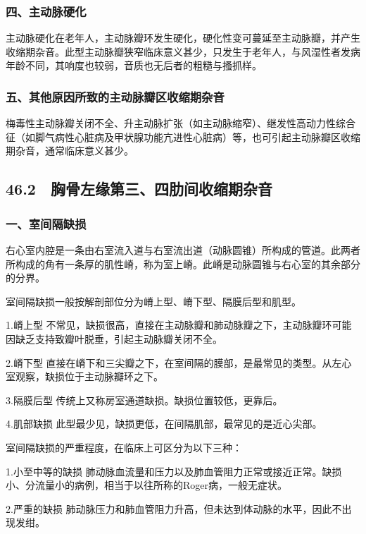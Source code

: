 \subsubsection{四、主动脉硬化}

主动脉硬化在老年人，主动脉瓣环发生硬化，硬化性变可蔓延至主动脉瓣，并产生收缩期杂音。此型主动脉瓣狭窄临床意义甚少，只发生于老年人，与风湿性者发病年龄不同，其响度也较弱，音质也无后者的粗糙与搔抓样。

\subsubsection{五、其他原因所致的主动脉瓣区收缩期杂音}

梅毒性主动脉瓣关闭不全、升主动脉扩张（如主动脉缩窄）、继发性高动力性综合征（如脚气病性心脏病及甲状腺功能亢进性心脏病）等，也可引起主动脉瓣区收缩期杂音，通常临床意义甚少。

\protect\hypertarget{text00127.html}{}{}

\subsection{46.2　胸骨左缘第三、四肋间收缩期杂音}

\subsubsection{一、室间隔缺损}

右心室内腔是一条由右室流入道与右室流出道（动脉圆锥）所构成的管道。此两者所构成的角有一条厚的肌性嵴，称为室上嵴。此嵴是动脉圆锥与右心室的其余部分的分界。

室间隔缺损一般按解剖部位分为嵴上型、嵴下型、隔膜后型和肌型。

1.嵴上型
不常见，缺损很高，直接在主动脉瓣和肺动脉瓣之下，主动脉瓣环可能因缺乏支持致瓣叶脱垂，引起主动脉瓣关闭不全。

2.嵴下型
直接在嵴下和三尖瓣之下，在室间隔的膜部，是最常见的类型。从左心室观察，缺损位于主动脉瓣环之下。

3.隔膜后型 传统上又称房室通道缺损。缺损位置较低，更靠后。

4.肌部缺损 此型最少见，缺损更低，在间隔肌部，最常见的是近心尖部。

室间隔缺损的严重程度，在临床上可区分为以下三种：

1.小至中等的缺损
肺动脉血流量和压力以及肺血管阻力正常或接近正常。缺损小、分流量小的病例，相当于以往所称的Roger病，一般无症状。

2.严重的缺损
肺动脉压力和肺血管阻力升高，但未达到体动脉的水平，因此不出现发绀。


